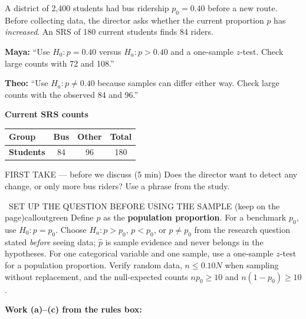 \documentclass[11pt]{article}
\begin{document}


A district of 2{,}400 students had bus ridership $p_0=0.40$ before a new route. Before collecting data, the director asks whether the current proportion $p$ has \emph{increased}. An SRS of 180 current students finds 84 riders.\par\smallskip \textbf{Maya:} ``Use $H_0:p=0.40$ versus $H_a:p>0.40$ and a one-sample $z$-test. Check large counts with 72 and 108.''\par \textbf{Theo:} ``Use $H_a:p\neq0.40$ because samples can differ either way. Check large counts with the observed 84 and 96.''\par
\begin{center}
\textbf{Current SRS counts}\par\smallskip
\begin{tabular}{|l|c|c|c|}
\hline
\textbf{Group} & \textbf{Bus} & \textbf{Other} & \textbf{Total} \\ \hline
\textbf{Students} & 84 & 96 & 180 \\ \hline
\end{tabular}
\end{center}
\begin{firsttakebox}{FIRST TAKE --- before we discuss (5 min)}
Does the director want to detect any change, or only more bus riders? Use a phrase from the study.
\workspace{0.9in}
\end{firsttakebox}

\begin{callout}{\IconBook\ SET UP THE QUESTION BEFORE USING THE SAMPLE (keep on the page)}{calloutgreen}
Define $p$ as the \textbf{population proportion}. For a benchmark $p_0$, use $H_0:p=p_0$.
Choose $H_a:p>p_0$, $p<p_0$, or $p\neq p_0$ from the research question stated \emph{before} seeing data;
$\hat p$ is sample evidence and never belongs in the hypotheses. For one categorical variable and one sample,
use a one-sample $z$-test for a population proportion. Verify random data, $n\leq0.10N$ when sampling without
replacement, and the null-expected counts $np_0\geq10$ and $n(1-p_0)\geq10$.
\end{callout}

\newpage
\textbf{Work (a)--(c) from the rules box:}\par\smallskip
\end{document}
